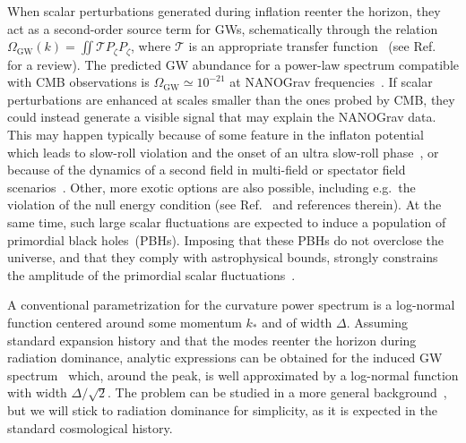 \documentclass{article}
\begin{document}
When scalar perturbations generated during inflation reenter the horizon, they act as a second-order source term for GWs, schematically through the relation $\Omega_\mathrm{GW}(k) = \iint \mathcal{T} P_\zeta P_\zeta $, where $\mathcal{T}$ is an appropriate transfer function~\cite{Acquaviva:2002ud, Mollerach:2003nq, Ananda:2006af, Baumann:2007zm} (see Ref.~\cite{Domenech:2021ztg} for a review). The predicted GW abundance for a power-law spectrum compatible with CMB observations is $\Omega_\mathrm{GW}\simeq 10^{-21}$ at NANOGrav frequencies~\cite{Ananda:2006af}. If scalar perturbations are enhanced at scales smaller than the ones probed by CMB, they could instead generate a visible signal that may explain the NANOGrav data. This may happen typically because of some feature in the inflaton potential which leads to slow-roll violation and the onset of an ultra slow-roll phase~\cite{Garcia-Bellido:2017mdw, Ballesteros:2017fsr}, or because of the dynamics of a second field in multi-field or spectator field scenarios~\cite{Cheong:2022gfc, Espinosa:2018eve}. Other, more exotic options are also possible, including e.g.\ the violation of the null energy condition (see Ref.~\cite{Cai:2023uhc} and references therein). At the same time, such large scalar fluctuations are expected to induce a population of primordial black holes~(PBHs). Imposing that these PBHs do not overclose the universe, and that they comply with astrophysical bounds, strongly constrains the amplitude of the primordial scalar fluctuations~\cite{Dandoy:2023jot}.

A conventional parametrization for the curvature power spectrum is a log-normal function centered around some momentum $k_*$ and of width $\Delta$.
Assuming standard expansion history and that the modes reenter the horizon during radiation dominance, analytic expressions can be obtained for the induced GW spectrum~\cite{Pi:2020otn, Dandoy:2023jot} which, around the peak, is well approximated by a log-normal function with width $\Delta/\sqrt{2}$.
The problem can be studied in a more general background~\cite{Kohri:2018awv, Domenech:2019quo}, but we will stick to radiation dominance for simplicity, as it is expected in the standard cosmological history.
\end{document}
